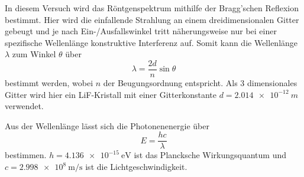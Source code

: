 In diesem Versuch wird das Röntgenspektrum mithilfe der Bragg'schen Reflexion bestimmt.
Hier wird die einfallende Strahlung an einem dreidimensionalen Gitter gebeugt und je nach Ein-/Ausfallswinkel tritt näherungsweise nur bei einer spezifische Wellenlänge konstruktive Interferenz auf. 
Somit kann die Wellenlänge $\lambda$ zum Winkel $\theta$ über
\begin{equation}
    \lambda = \frac{2d}{n}\sin\theta
    \label{eq:bragg}
\end{equation}
bestimmt werden, wobei $n$ der Beugungsordnung entspricht.
Als 3 dimensionales Gitter wird hier ein LiF-Kristall mit einer Gitterkonstante $d=\SI{2.014e-12}{m}$ verwendet.

Aus der Wellenlänge lässt sich die Photonenenergie über
\begin{equation}
    E = \frac{hc}{\lambda}
    \label{eq:energie}
\end{equation}
bestimmen. 
$h=\SI{4.136e-15}{\electronvolt}$ ist das Plancksche Wirkungsquantum und $c=\SI{2.998e8}{\metre\per\second}$ ist die Lichtgeschwindigkeit.\cite{physics_constants}